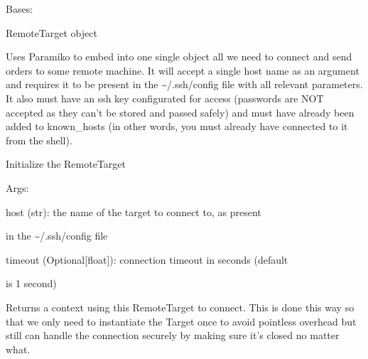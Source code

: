 \documentclass[letterpaper,10pt,english]{sphinxmanual}
\begin{document}
\begin{fulllineitems}
\label{doctree/soprano.hpc.submitter.utils:soprano.hpc.submitter.utils.RemoteTarget}
Bases: 

RemoteTarget object

Uses Paramiko to embed into one single object all we need to connect
and send orders to some remote machine. It will accept a single host name
as an argument and requires it to be present in the \textasciitilde{}/.ssh/config file
with all relevant parameters. It also must have an ssh key configurated
for access (passwords are NOT accepted as they can't be stored and passed
safely) and must have already been added to known\_hosts (in other words,
you must already have connected to it from the shell).

Initialize the RemoteTarget

\begin{DUlineblock}{0em}
\item[] Args:
\item[]
\begin{DUlineblock}{\DUlineblockindent}
\item[] host (str): the name of the target to connect to, as present
\item[]
\begin{DUlineblock}{\DUlineblockindent}
\item[] in the \textasciitilde{}/.ssh/config file
\end{DUlineblock}
\item[] timeout (Optional{[}float{]}): connection timeout in seconds (default
\item[]
\begin{DUlineblock}{\DUlineblockindent}
\item[] is 1 second)
\end{DUlineblock}
\end{DUlineblock}
\end{DUlineblock}

\begin{fulllineitems}
\label{doctree/soprano.hpc.submitter.utils:soprano.hpc.submitter.utils.RemoteTarget.context}
Returns a context using this RemoteTarget to connect.
This is done this way so that we only need to instantiate the Target
once to avoid pointless overhead but still can handle the connection
securely by making sure it's closed no matter what.

\end{fulllineitems}


\end{fulllineitems}
\end{document}
